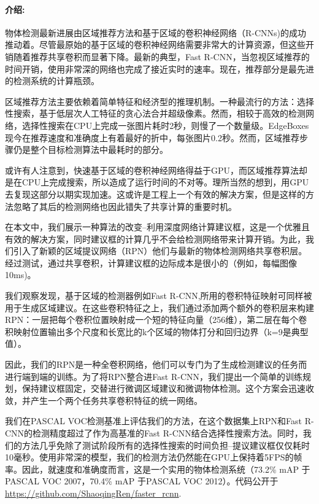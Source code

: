 \documentclass[12pt,a4paper,titlepage]{article}
\begin{document}
\paragraph{介绍:}
物体检测最新进展由区域推荐方法和基于区域的卷积神经网络（R-CNNs)的成功推动着。尽管最原始的基于区域的卷积神经网络需要非常大的计算资源，但这些开销随着推荐共享卷积而显著下降。最新的典型，Fast R-CNN，当忽视区域推荐的时间开销，使用非常深的网络也完成了接近实时的速率。现在，推荐部分是最先进的检测系统的计算瓶颈。\par

区域推荐方法主要依赖着简单特征和经济型的推理机制。一种最流行的方法：选择性搜索，基于低层次人工特征的贪心法合并超级像素。然而，相较于高效的检测网络，选择性搜索在CPU上完成一张图片耗时2秒，则慢了一个数量级。EdgeBoxes现今在推荐速度和准确度上有着最好的折中，每张图片0.2秒。然而，区域推荐步骤仍是整个目标检测算法中最耗时的部分。\par

或许有人注意到，快速基于区域的卷积神经网络得益于GPU，而区域推荐算法却是在CPU上完成搜索，所以造成了运行时间的不对等。理所当然的想到，用GPU去复现这部分以期实现加速。这或许是工程上一个有效的解决方案，但是这样的方法忽略了其后的检测网络也因此错失了共享计算的重要时机。\par

在本文中，我们展示一种算法的改变--利用深度网络计算建议框，这是一个优雅且有效的解决方案，同时建议框的计算几乎不会给检测网络带来计算开销。为此，我们引入了新颖的区域提议网络（RPN）他们与最新的物体检测网络共享卷积层。经过测试，通过共享卷积，计算建议框的边际成本是很小的（例如，每幅图像10ms)。\par

我们观察发现，基于区域的检测器例如Fast R-CNN,所用的卷积特征映射可同样被用于生成区域建议。在这些卷积特征之上，我们通过添加两个额外的卷积层来构建RPN：一层把每个卷积位置映射成一个短的特征向量（256维），第二层在每个卷积映射位置输出多个尺度和长宽比的k个区域的物体打分和回归边界（k=9是典型值）。\par

因此，我们的RPN是一种全卷积网络，他们可以专门为了生成检测建议的任务而进行端到端的训练。为了将RPN整合进Fast R-CNN，我们提出一个简单的训练规划，保持建议框固定，交替进行微调区域建议和微调物体检测。这个方案会迅速收敛，并产生一个两个任务共享卷积特征的统一网络。\par

我们在PASCAL VOC检测基准上评估我们的方法，在这个数据集上RPN和Fast R-CNN的检测精度超过了作为高基准的Fast R-CNN结合选择性搜索方法。同时，我们的方法几乎免除了测试阶段所有的选择性搜索的时间负担--提议建议框仅仅耗时10毫秒。使用非常深的模型，我们的检测方法仍然能在GPU上保持着5FPS的帧率。因此，就速度和准确度而言，这是一个实用的物体检测系统（73.2\% mAP 于PASCAL VOC 2007，70.4\% mAP 于PASCAL VOC 2012）。代码公开于 \url{https://github.com/ShaoqingRen/faster_rcnn}.
\end{document}
